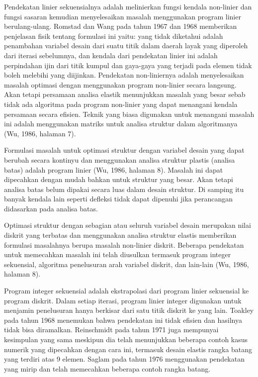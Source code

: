 Pendekatan linier sekuensialnya adalah melinierkan fungsi kendala
non-linier dan fungsi sasaran kemudian menyelesaikan masalah menggunakan
program linier berulang-ulang. Romstad dan Wang pada tahun 1967 dan 1968
memberikan penjelasan fisik tentang formulasi ini yaitu: yang tidak
diketahui adalah penambahan variabel desain dari suatu titik dalam daerah
layak yang diperoleh dari iterasi sebelumnya, dan kendala dari pendekatan
linier ini adalah perpindahan ijin dari titik kumpul dan gaya-gaya yang
terjadi pada elemen tidak boleh melebihi yang diijinkan. Pendekatan
non-liniernya adalah menyelesaikan masalah optimasi dengan menggunakan
program non-linier secara langsung. Akan tetapi persamaan analisa elastik
menunjukkan masalah yang besar sebab tidak ada algoritma pada program
non-linier yang dapat menangani kendala persamaan secara efisien. Teknik
yang biasa digunakan untuk menangani masalah ini adalah menggunakan
matriks untuk analisa struktur dalam algoritmanya (Wu, 1986, halaman 7).

Formulasi masalah untuk optimasi struktur dengan variabel desain yang
dapat berubah secara kontinyu dan menggunakan analisa struktur plastis
(analisa batas) adalah program linier (Wu, 1986, halaman 8). Masalah ini
dapat dipecahkan dengan mudah bahkan untuk struktur yang besar. Akan
tetapi analisa batas belum dipakai secara luas dalam desain struktur. Di
samping itu banyak kendala lain seperti defleksi tidak dapat dipenuhi
jika perancangan didasarkan pada analisa batas.

Optimasi struktur dengan sebagian atau seluruh variabel desain merupakan
nilai diskrit yang terbatas dan menggunakan analisa struktur elastis
memberikan formulasi masalahnya berupa masalah non-linier diskrit.
Beberapa pendekatan untuk memecahkan masalah ini telah diusulkan termasuk
program integer sekuensial, algoritma penelusuran arah variabel diskrit,
dan lain-lain (Wu, 1986, halaman 8).

Program integer sekuensial adalah ekstrapolasi dari program linier
sekuensial ke program diskrit. Dalam setiap iterasi, program linier
integer digunakan untuk menjamin penelusuran hanya berkisar dari satu
titik diskrit ke yang lain. Toakley pada tahun 1968 menemukan bahwa
pendekatan ini tidak efisien dan hasilnya tidak bisa diramalkan.
Reinschmidt pada tahun 1971 juga mempunyai kesimpulan yang sama meskipun
dia telah menunjukkan beberapa contoh kasus numerik yang dipecahkan
dengan cara ini, termasuk desain elastis rangka batang yang terdiri atas
9 elemen. Saglam pada tahun 1976 menggunakan pendekatan yang mirip dan
telah memecahkan beberapa contoh rangka batang.

